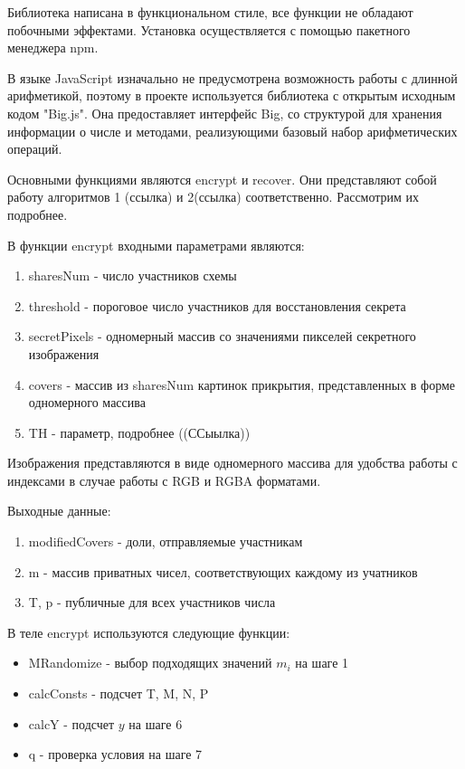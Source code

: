 \documentclass[a4paper,article,14pt]{extarticle}
\begin{document}
Библиотека написана в функциональном стиле, все функции не обладают побочными эффектами.
Установка осуществляется с помощью пакетного менеджера npm.

В языке JavaScript изначально не предусмотрена возможность работы с длинной арифметикой, поэтому в проекте используется библиотека
с открытым исходным кодом "Big.js". Она предоставляет интерфейс Big, со структурой для хранения информации о числе и методами, 
реализующими базовый набор арифметических операций.

Основными функциями являются encrypt и recover. Они представляют собой работу алгоритмов 1 (ссылка) и 2(ссылка) соответственно. Рассмотрим
их подробнее.

В функции encrypt входными параметрами являются:
\begin{enumerate}[leftmargin=2cm]
    \item sharesNum - число участников схемы
    \item threshold - пороговое число участников для восстановления секрета
    \item secretPixels - одномерный массив со значениями пикселей секретного изображения
    \item covers - массив из sharesNum картинок прикрытия, представленных в форме одномерного массива
    \item TH - параметр, подробнее ((ССыылка))
\end{enumerate}

Изображения представляются в виде одномерного массива для удобства работы с индексами в случае работы с RGB и RGBA форматами.

Выходные данные:

\begin{enumerate}
    \setlength{\itemindent}{3em}
    \item modifiedCovers - доли, отправляемые участникам
    \item m - массив приватных чисел, соответствующих каждому из учатников 
    \item T, p - публичные для всех участников числа
\end{enumerate}

В теле encrypt используются следующие функции: 
\begin{itemize}
    \setlength{\itemindent}{3em}
    \item MRandomize - выбор подходящих значений $m_i$ на шаге 1
    \item calcConsts - подсчет T, M, N, P
    \item calcY - подсчет $y$ на шаге 6
    \item q - проверка условия на шаге 7
\end{itemize}
\end{document}
